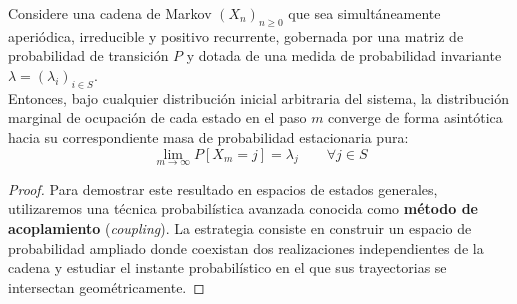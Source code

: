 \documentclass[10pt]{book}
\begin{document}
\begin{teo}
    Considere una cadena de Markov $(X_n)_{n \geq 0}$ que sea simultáneamente aperiódica, irreducible y positivo recurrente, gobernada por una matriz de probabilidad de transición $P$ y dotada de una medida de probabilidad invariante $\lambda = (\lambda_i)_{i \in S}$. \\

    \noindent
    Entonces, bajo cualquier distribución inicial arbitraria del sistema, la distribución marginal de ocupación de cada estado en el paso $m$ converge de forma asintótica hacia su correspondiente masa de probabilidad estacionaria pura:
    \[ 
    \lim_{m \to \infty} P[X_m = j] = \lambda_j \qquad \forall j \in S 
    \]
\begin{proof}
Para demostrar este resultado en espacios de estados generales, utilizaremos una técnica probabilística avanzada conocida como \textbf{método de acoplamiento} (\textit{coupling}). La estrategia consiste en construir un espacio de probabilidad ampliado donde coexistan dos realizaciones independientes de la cadena y estudiar el instante probabilístico en el que sus trayectorias se intersectan geométricamente.


\end{proof}
\end{teo}
\end{document}
